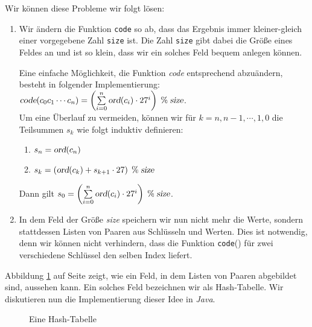 Wir k\"onnen diese Probleme wir folgt l\"osen:
\begin{enumerate}
\item Wir \"andern die Funktion \texttt{code} so ab, dass das Ergebnis
      immer kleiner-gleich einer vorgegebene Zahl \texttt{size} ist.  Die Zahl
      \texttt{size} gibt dabei die Gr\"o{\ss}e eines Feldes an und ist so klein,
      dass wir ein solches Feld bequem anlegen k\"onnen.

      Eine einfache M\"oglichkeit, die Funktion \textsl{code} entsprechend abzu\"andern,
      besteht in folgender Implementierung: \\[0.2cm]
      \hspace*{1.3cm} 
      $\textsl{code}(c_0c_1\cdots c_n) = \left(\sum\limits_{i=0}^n \textsl{ord}(c_i) \cdot 27^i\right) \;\%\; \textsl{size}$.
      \\[0.2cm]
      Um eine Überlauf zu vermeiden, k\"onnen wir f\"ur $k=n,n-1,\cdots,1,0$ die Teilsummen $s_k$
      wie folgt induktiv definieren:
      \begin{enumerate}
      \item $s_n = \textsl{ord}(c_n)$
      \item $s_{k} = \left(\textsl{ord}(c_{k}) + s_{k+1} \cdot 27 \right) \;\%\; \textsl{size}$
      \end{enumerate}
      Dann gilt
      \hspace*{1.3cm} 
      $s_0 = \left(\sum\limits_{i=0}^n \textsl{ord}(c_i) \cdot 27^i\right) \;\%\; \textsl{size}$.
      
\item In dem Feld der Gr\"o{\ss}e \textsl{size} speichern wir nun nicht mehr die Werte, sondern stattdessen
      Listen von Paaren aus Schl\"usseln und Werten.  Dies ist notwendig, denn wir k\"onnen
      nicht verhindern, dass die Funktion \texttt{code}() f\"ur zwei verschiedene
      Schl\"ussel den selben Index liefert.
\end{enumerate}
Abbildung \ref{fig:hash-example} auf Seite \pageref{fig:hash-example} zeigt, wie ein Feld,
in dem Listen von Paaren abgebildet sind, aussehen kann.  Ein solches Feld bezeichnen wir
als Hash-Tabelle.  Wir diskutieren nun die Implementierung dieser Idee in \textsl{Java}.


\begin{figure}[!ht]
  \centering
  \caption{Eine Hash-Tabelle}
  \label{fig:hash-example}
\end{figure}


